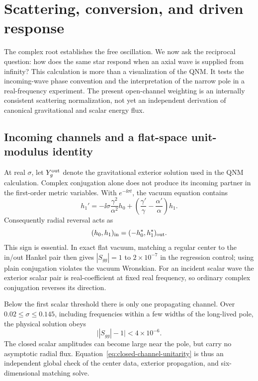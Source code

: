 \section{Scattering, conversion, and driven response}
\label{sec:axial-response}

The complex root establishes the free oscillation.  We now ask the reciprocal
question: how does the same star respond when an axial wave is supplied from
infinity?  This calculation is more than a visualization of the QNM.  It
tests the incoming-wave phase convention and the interpretation of the narrow
pole in a real-frequency experiment.  The present open-channel weighting is
an internally consistent scattering normalization, not yet an independent
derivation of canonical gravitational and scalar energy flux.

\subsection{Incoming channels and a flat-space unit-modulus identity}

At real $\sigma$, let $Y_g^{\rm out}$ denote the gravitational exterior
solution used in the QNM calculation.  Complex conjugation alone does not
produce its incoming partner in the first-order metric variables.  With
$e^{-\ii\sigma t}$, the vacuum equation contains
\begin{equation}
h_1'=-\ii\sigma\frac{\gamma^2}{\alpha^2}h_0+
\left(\frac{\gamma'}{\gamma}-\frac{\alpha'}{\alpha}\right)h_1 .
\end{equation}
Consequently radial reversal acts as
\begin{equation}
(h_0,h_1)_{\rm in}=(-h_0^*,h_1^*)_{\rm out}.
\label{eq:metric-incoming-map}
\end{equation}
This sign is essential.  In exact flat vacuum, matching a regular center to
the in/out Hankel pair then gives $|S_{gg}|=1$ to $2\times10^{-7}$ in the
regression control; using plain conjugation violates the vacuum Wronskian.
For an incident scalar wave the exterior scalar pair is real-coefficient at
fixed real frequency, so ordinary complex conjugation reverses its direction.

Below the first scalar threshold there is only one propagating channel.  Over
$0.02\leq\sigma\leq0.145$, including frequencies within a few widths of the
long-lived pole, the physical solution obeys
\begin{equation}
\bigl||S_{gg}|-1\bigr|<4\times10^{-6}.
\label{eq:closed-channel-unitarity}
\end{equation}
The closed scalar amplitudes can become large near the pole, but carry no
asymptotic radial flux.  Equation~\eqref{eq:closed-channel-unitarity} is thus
an independent global check of the center data, exterior propagation, and
six-dimensional matching solve.

